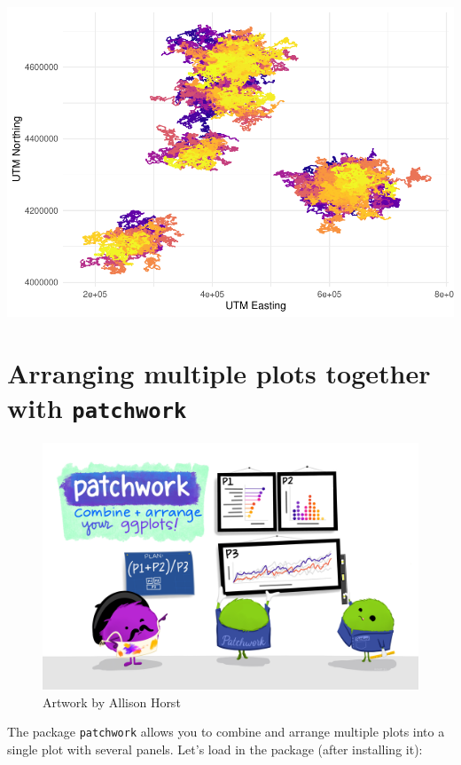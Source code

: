 \documentclass[
]{book}
\begin{document}
\includegraphics{reproducible-science_files/figure-latex/gg32-1.pdf}

\hypertarget{arranging-multiple-plots-together-with-patchwork}{%
\section{\texorpdfstring{Arranging multiple plots together with \texttt{patchwork}}{Arranging multiple plots together with patchwork}}\label{arranging-multiple-plots-together-with-patchwork}}

\begin{figure}

{\centering \includegraphics[width=0.8\linewidth]{img/patchwork_1} 

}

\caption{Artwork by Allison Horst}\label{fig:gg33}
\end{figure}

The package \texttt{patchwork} allows you to combine and arrange multiple plots into
a single plot with several panels. Let's load in the package (after installing
it):
\end{document}
